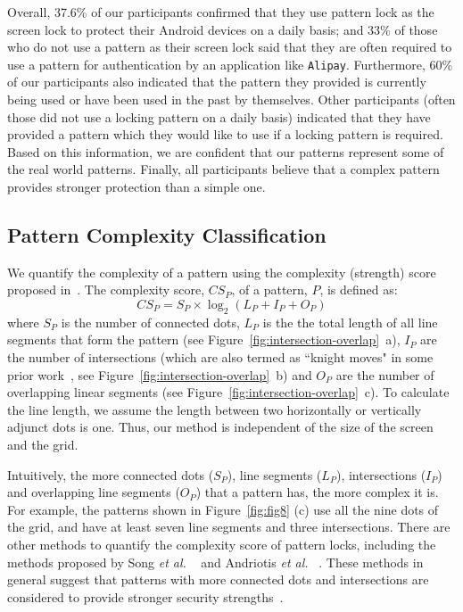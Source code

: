      Overall, 37.6\% of our participants confirmed that they use pattern lock as the screen lock to
     protect their Android devices on a daily basis; and 33\% of those  who do not use a pattern as their screen lock said that they
     are often required to use a pattern for authentication by an application like \texttt{Alipay}. Furthermore, 60\%
     of our participants also indicated that the pattern they provided is currently being used
     or have been used in the past by themselves. Other participants (often those did not use a locking pattern on a daily basis) indicated that they
     have provided a pattern which they would like to use if a locking
     pattern is required. Based on this information, we are confident
     that our patterns represent some of the real world
     patterns. Finally, all participants believe that a complex pattern provides stronger protection than a simple one.

    \subsection{Pattern Complexity Classification}
    \label{section: pattern-complexity-classification}
    We quantify the complexity of a pattern using the complexity (strength) score proposed in~\cite{sun2014dissecting}.
        The complexity score, $CS_{P}$, of a pattern, $P$, is defined as:
    \begin{equation}
      CS_{P}=S_{P}\times\log_{2}(L_{P}+I_{P}+O_{P})
    \label{equ:compscore}
    \end{equation}
    where $S_{P}$ is the number of connected dots, $L_{P}$ is the the total length of all line segments that form the pattern (see Figure~\ref{fig:intersection-overlap}~a), $I_{P}$ are the number of intersections (which are also termed as ``knight moves" in some prior work~\cite{vonZezschwitz:2015:EDB:2702123.2702202}, see Figure~\ref{fig:intersection-overlap}~b) and $O_{P}$ are the number of overlapping linear segments (see Figure~\ref{fig:intersection-overlap}~c).  To calculate the line length, we assume the length between two horizontally or vertically adjunct dots is one. Thus, our method is independent of the size of the screen and the grid.


    Intuitively, the more connected dots ($S_{P}$), line segments ($L_{P}$),
    intersections ($I_{P}$) and overlapping line segments ($O_{P}$) that a
    pattern has, the more complex it is. For example, the patterns shown in
    Figure~\ref{fig:fig8} (c) use all the nine dots of the grid, and have  at
    least seven line segments and three intersections.
    There are other methods to quantify the complexity score of pattern locks, including the methods proposed by Song \emph{et al.} ~\cite{Song2015On} and Andriotis \emph{et al.}
    ~\cite{Andriotis2014Complexity}. These methods in general suggest that patterns with more connected dots and intersections are considered to provide stronger security strengths~\cite{Heidt2016Refining}.

